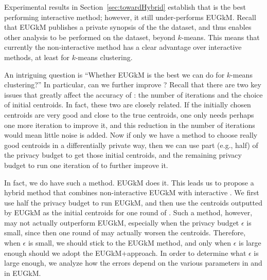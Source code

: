 
Experimental results in Section~\ref{sec:towardHybrid} establish that \dpl is the best performing interactive method; however, it still under-performs EUGkM.  Recall that EUGkM publishes a private synopsis of the the dataset, and thus enables other analysis to be performed on the dataset, beyond $k$-means.  This means that currently the non-interactive method has a clear advantage over interactive methods, at least for $k$-means clustering.  

An intriguing question is ``Whether EUGkM is the best we can do for $k$-means clustering?'' In particular, can we further improve \dpl?  Recall that there are two key issues that greatly affect the accuracy of \dpl: the number of iterations and the choice of initial centroids.  In fact, these two are closely related.  If the initially chosen centroids are very good and close to the true centroids, one only needs perhaps one more iteration to improve it, and this reduction in the number of iterations would mean little noise is added.  Now if only we have a method to choose really good centroids in a differentially private way, then we can use part (e.g., half) of the privacy budget to get those initial centroids, and the remaining privacy budget to run one iteration of \dpl to further improve it.  

In fact, we do have such a method.  EUGkM does it.  This leads us to propose a hybrid method that combines non-interactive EUGkM with interactive \dpl.  We first use half the privacy budget to run EUGkM, and then use the centroids outputted by EUGkM as the initial centroids for one round of \dpl.  Such a method, however, may not actually outperform EUGkM, especially when the privacy budget $\epsilon$ is small, since then one round of \dpl may actually worsen the centroids.  Therefore, when $\epsilon$ is small, we should stick to the EUGkM method, and only when $\epsilon$ is large enough should we adopt the EUGkM+\dpl approach.  In order to determine what $\epsilon$ is large enough, we analyze how the errors depend on the various parameters in \dpl and in EUGkM.



